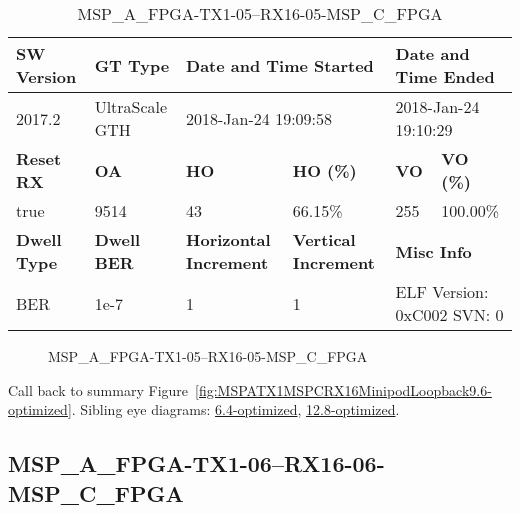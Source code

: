 \begin{table}[h]
\centering
\caption{MSP\_A\_FPGA-TX1-05--RX16-05-MSP\_C\_FPGA}
\label{tab:MSPAFPGATX105RX1605MSPCFPGA9.6-optimized}
\begin{tabular}{@{}|l|l|l|l|l|l|@{}}
\toprule
\textbf{SW Version}                & \textbf{GT Type}   & \multicolumn{2}{l|}{\textbf{Date and Time Started}}            & \multicolumn{2}{l|}{\textbf{Date and Time Ended}}        \\ \midrule
2017.2                       & UltraScale GTH          & \multicolumn{2}{l|}{2018-Jan-24 19:09:58}                   & \multicolumn{2}{l|}{2018-Jan-24 19:10:29}               \\ \midrule
\textbf{Reset RX}                  & \textbf{OA} & \textbf{HO}   & \textbf{HO (\%)} & \textbf{VO} & \textbf{VO (\%)} \\ \midrule
true & 9514        & 43          & 66.15\%        & 255        & 100.00\%       \\ \midrule
\textbf{Dwell Type}                & \textbf{Dwell BER} & \textbf{Horizontal Increment} & \textbf{Vertical Increment}    & \multicolumn{2}{l|}{\textbf{Misc Info}}                  \\ \midrule
BER                            & 1e-7        & 1        & 1           & \multicolumn{2}{l|}{ELF Version: 0xC002 SVN: 0}                         \\ \bottomrule
\end{tabular}
\end{table}

\begin{figure}[h]
\caption{MSP\_A\_FPGA-TX1-05--RX16-05-MSP\_C\_FPGA} \label{fig:MSPAFPGATX105RX1605MSPCFPGA9.6-optimized}
\end{figure}

Call back to summary Figure~\ref{fig:MSPATX1MSPCRX16MinipodLoopback9.6-optimized}.
Sibling eye diagrams: \hyperref[sec:MSPAFPGATX105RX1605MSPCFPGA6.4-optimized]{6.4-optimized}, \hyperref[sec:MSPAFPGATX105RX1605MSPCFPGA12.8-optimized]{12.8-optimized}.

\clearpage
\newpage


\subsection{MSP\_A\_FPGA-TX1-06--RX16-06-MSP\_C\_FPGA}\label{sec:MSPAFPGATX106RX1606MSPCFPGA9.6-optimized}

